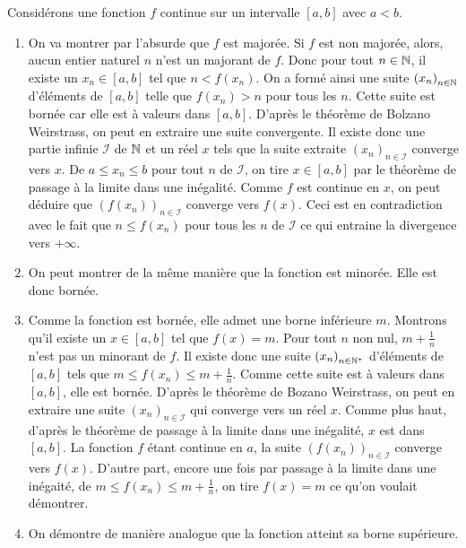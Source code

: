 \begin{demo}
 Considérons une fonction $f$ continue sur un intervalle $[a,b]$ avec $a<b$.
\begin{enumerate}
 \item On va montrer par l'absurde que $f$ est majorée. \newline
Si $f$ est non majorée, alors, aucun entier naturel $n$ n'est un majorant de $f$. Donc pour tout $n\in \mathbb{N}$, il existe un $x_n\in[a,b]$ tel que $n<f(x_n)$. On a formé ainsi une suite $\left( x_n\right) _{n\in \mathbb{N}}$ d'éléments de $[a,b]$ telle que $f(x_n)>n$ pour tous les $n$.\newline
Cette suite est bornée car elle est à valeurs dans $[a,b]$. D'après le théorème de Bolzano Weirstrass, on peut en extraire une suite convergente. Il existe donc une partie infinie $\mathcal I$ de $\mathbb{N}$ et un réel $x$ tels que la suite extraite $\left( x_n\right) _{n\in \mathcal I}$ converge vers $x$.\newline
De $a\leq x_n \leq b$ pour tout $n$ de $\mathcal{I}$, on tire $x\in[a,b]$ par le théorème de passage à la limite dans une inégalité.\newline
Comme $f$ est continue en $x$, on peut déduire que $\left( f(x_n)\right) _{n\in \mathcal I}$ converge vers $f(x)$.\newline
Ceci est en contradiction avec le fait que $n\leq f(x_n)$ pour tous les $n$ de $\mathcal I$ ce qui entraine la divergence vers $+\infty$. 

\item On peut montrer de la même manière que la fonction est minorée. Elle est donc bornée.

\item Comme la fonction est bornée, elle admet une borne inférieure $m$. Montrons qu'il existe un $x\in[a,b]$ tel que $f(x)=m$.\newline
Pour tout $n$ non nul, $m+\frac{1}{n}$ n'est pas un minorant de $f$. Il existe donc une suite $\left( x_n\right) _{n\in \mathbb{N}^*}$ d'éléments de $[a,b]$ tels que $m \leq f(x_n)\leq m+\frac{1}{n}$.\newline
Comme cette suite est à valeurs dans $[a,b]$, elle est bornée. D'après le théorème de Bozano Weirstrass, on peut en extraire une suite $\left( x_n\right) _{n\in \mathcal I}$ qui converge vers un réel $x$.\newline
Comme plus haut, d'après le théorème de passage à la limite dans une inégalité, $x$ est dans $[a,b]$. La fonction $f$ étant continue en $a$, la suite $\left( f(x_n)\right) _{n\in \mathcal I}$ converge vers $f(x)$.\newline
D'autre part, encore une fois par passage à la limite dans une inégaité, de $m \leq f(x_n)\leq m+\frac{1}{n}$, on tire $f(x)=m$ ce qu'on voulait démontrer.

\item On démontre de manière analogue que la fonction atteint sa borne supérieure. 
\end{enumerate}
\end{demo}
